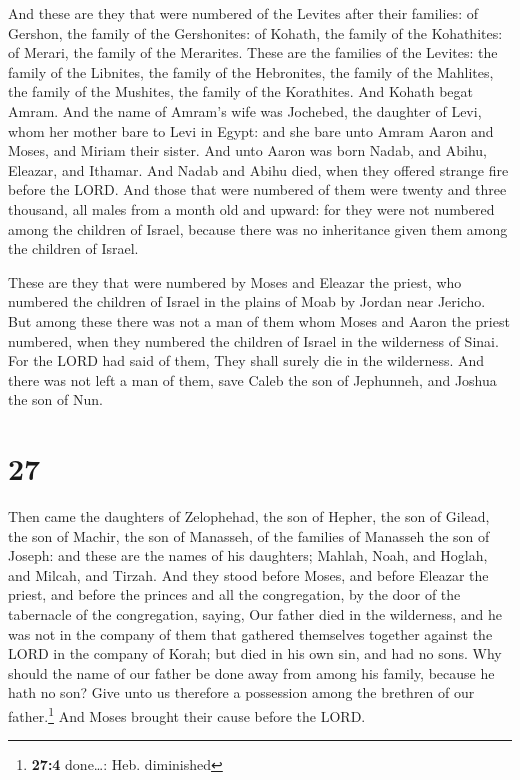  And these are they that were numbered of the Levites
after their families: of Gershon, the family of the Gershonites: of
Kohath, the family of the Kohathites: of Merari, the family of the
Merarites.  These are the families of the Levites: the
family of the Libnites, the family of the Hebronites, the family of the
Mahlites, the family of the Mushites, the family of the Korathites. And
Kohath begat Amram.  And the name of Amram's wife was
Jochebed, the daughter of Levi, whom her mother bare to Levi in Egypt:
and she bare unto Amram Aaron and Moses, and Miriam their sister.
 And unto Aaron was born Nadab, and Abihu, Eleazar, and
Ithamar.  And Nadab and Abihu died, when they offered
strange fire before the LORD.  And those that were
numbered of them were twenty and three thousand, all males from a month
old and upward: for they were not numbered among the children of Israel,
because there was no inheritance given them among the children of
Israel.

 These are they that were numbered by Moses and Eleazar
the priest, who numbered the children of Israel in the plains of Moab by
Jordan near Jericho.  But among these there was not a man
of them whom Moses and Aaron the priest numbered, when they numbered the
children of Israel in the wilderness of Sinai.  For the
LORD had said of them, They shall surely die in the wilderness. And
there was not left a man of them, save Caleb the son of Jephunneh, and
Joshua the son of Nun.

\hypertarget{section-26}{%
\section{27}\label{section-26}}

 Then came the daughters of Zelophehad, the son of Hepher,
the son of Gilead, the son of Machir, the son of Manasseh, of the
families of Manasseh the son of Joseph: and these are the names of his
daughters; Mahlah, Noah, and Hoglah, and Milcah, and Tirzah.
 And they stood before Moses, and before Eleazar the
priest, and before the princes and all the congregation, by the door of
the tabernacle of the congregation, saying,  Our father
died in the wilderness, and he was not in the company of them that
gathered themselves together against the LORD in the company of Korah;
but died in his own sin, and had no sons.  Why should the
name of our father be done away from among his family, because he hath
no son? Give unto us therefore a possession among the brethren of our
father.\footnote{\textbf{27:4} done\ldots: Heb. diminished}
 And Moses brought their cause before the LORD.

